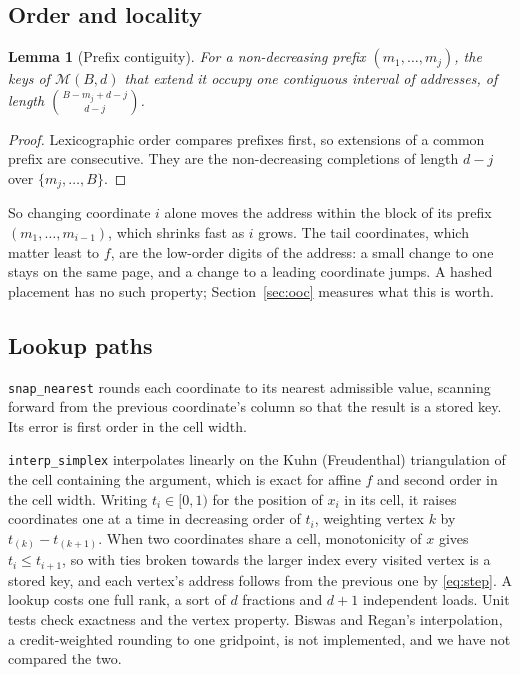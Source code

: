\documentclass[preprint,12pt]{elsarticle}
\newtheorem{lemma}[theorem]{Lemma}
\begin{document}
\subsection{Order and locality}\label{sec:locality}
\begin{lemma}[Prefix contiguity]\label{lem:prefix}
For a non-decreasing prefix $(m_1,\dots,m_j)$, the keys of $\mathcal{M}(B,d)$
that extend it occupy one contiguous interval of addresses, of length
$\binom{B-m_j+d-j}{d-j}$.
\end{lemma}
\begin{proof}
Lexicographic order compares prefixes first, so extensions of a common prefix
are consecutive. They are the non-decreasing completions of length $d-j$ over
$\{m_j,\dots,B\}$.
\end{proof}

So changing coordinate $i$ alone moves the address within the block of its prefix $(m_1,\dots,m_{i-1})$, which shrinks fast as $i$ grows. The tail coordinates, which matter least to $f$, are the low-order digits of the address: a small change to one stays on the same page, and a change to a leading coordinate jumps. A hashed placement has no such property; Section~\ref{sec:ooc} measures what this is worth.

\subsection{Lookup paths}\label{sec:lookup}
\texttt{snap\_nearest} rounds each coordinate to its nearest admissible value,
scanning forward from the previous coordinate's column so that the result is a
stored key. Its error is first order in the cell width.

\texttt{interp\_simplex} interpolates linearly on the Kuhn (Freudenthal)
triangulation of the cell containing the
argument,\cite{freudenthal1942,kuhn1960,weiser1988} which is exact for affine $f$
and second order in the cell width. Writing $t_i\in[0,1)$ for the position of
$x_i$ in its cell, it raises coordinates one at a time in decreasing order of
$t_i$, weighting vertex $k$ by $t_{(k)}-t_{(k+1)}$. When two coordinates share a
cell, monotonicity of $x$ gives $t_i\le t_{i+1}$, so with ties broken towards the
larger index every visited vertex is a stored key, and each vertex's address
follows from the previous one by \eqref{eq:step}. A lookup costs one full rank, a
sort of $d$ fractions and $d{+}1$ independent loads. Unit tests check exactness and the vertex property. Biswas and Regan's interpolation, a credit-weighted rounding to one gridpoint, is not implemented, and we have not compared the two.
\end{document}
